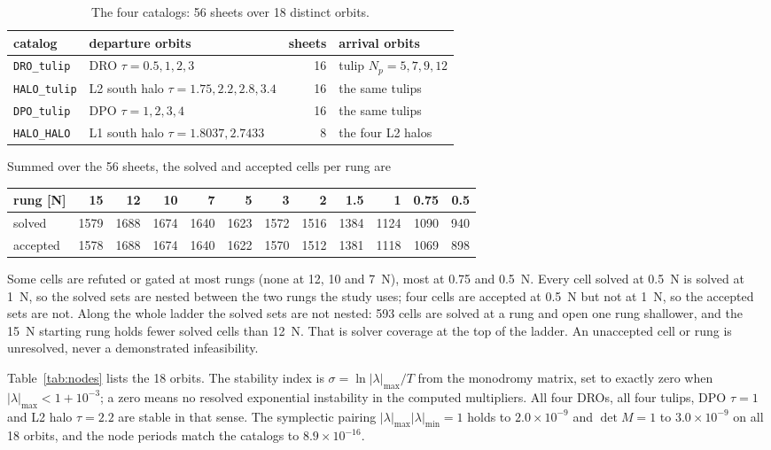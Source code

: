 \documentclass[11pt]{article}
\begin{document}
\begin{table}[tbp]
\centering\small
\begin{tabular}{@{}llrl@{}}
\toprule
catalog & departure orbits & sheets & arrival orbits \\
\midrule
\texttt{DRO\_tulip}  & DRO $\tau = 0.5, 1, 2, 3$ & 16 & tulip $N_p = 5, 7, 9, 12$ \\
\texttt{HALO\_tulip} & L2 south halo $\tau = 1.75, 2.2, 2.8, 3.4$ & 16 & the same tulips \\
\texttt{DPO\_tulip}  & DPO $\tau = 1, 2, 3, 4$ & 16 & the same tulips \\
\texttt{HALO\_HALO}  & L1 south halo $\tau = 1.8037, 2.7433$ & 8 & the four L2 halos \\
\bottomrule
\end{tabular}
\caption{The four catalogs: 56 sheets over 18 distinct orbits.}
\label{tab:catalogs}
\end{table}

Summed over the 56 sheets, the solved and accepted cells per rung are
\begin{center}\small
\begin{tabular}{@{}lrrrrrrrrrrr@{}}
\toprule
rung [N] & 15 & 12 & 10 & 7 & 5 & 3 & 2 & 1.5 & 1 & 0.75 & 0.5 \\
\midrule
solved   & 1579 & 1688 & 1674 & 1640 & 1623 & 1572 & 1516 & 1384 & 1124 & 1090 & 940 \\
accepted & 1578 & 1688 & 1674 & 1640 & 1622 & 1570 & 1512 & 1381 & 1118 & 1069 & 898 \\
\bottomrule
\end{tabular}
\end{center}
Some cells are refuted or gated
at most rungs (none at 12, 10 and 7~N), most at 0.75 and 0.5~N. Every cell solved at 0.5~N is solved at 1~N, so the
solved sets are nested between the two rungs the study uses; four cells are accepted at 0.5~N but
not at 1~N, so the accepted sets are not. Along the whole ladder the solved sets are not nested:
593 cells are solved at a rung and open one rung shallower, and the 15~N starting rung holds fewer
solved cells than 12~N. That is solver coverage at the top of the ladder. An unaccepted cell or rung
is unresolved, never a demonstrated infeasibility.

Table~\ref{tab:nodes} lists the 18 orbits. The stability index is
$\sigma = \ln|\lambda|_{\max}/T$ from the monodromy matrix, set to exactly zero when
$|\lambda|_{\max} < 1 + 10^{-3}$; a zero means no resolved exponential instability in the computed
multipliers. All four DROs, all four tulips, DPO $\tau=1$ and L2 halo $\tau=2.2$ are stable in that
sense. The symplectic pairing $|\lambda|_{\max}|\lambda|_{\min} = 1$ holds to $2.0\times10^{-9}$ and
$\det M = 1$ to $3.0\times10^{-9}$ on all 18 orbits, and the node periods match the catalogs to
$8.9\times10^{-16}$.
\end{document}

